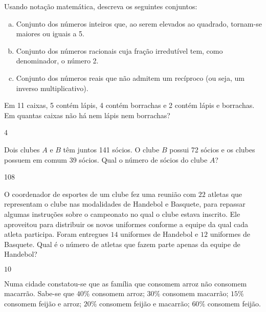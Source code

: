 \newpage
\begin{secExercicios}

\begin{exer}
    Usando notação matemática, descreva os seguintes conjuntos:
    \begin{enumerate}[a)]
        \item Conjunto dos números inteiros que, ao serem elevados ao quadrado, tornam-se maiores ou iguais a 5.
        \item Conjunto dos números racionais cuja fração irredutível tem, como denominador, o número 2.
        \item Conjunto dos números reais que não admitem um recíproco (ou seja, um inverso multiplicativo).
    \end{enumerate}
\end{exer}

\begin{exer}
    Em 11 caixas, 5 contém lápis, 4 contém borrachas e 2 contém lápis e borrachas. Em quantas caixas não há nem lápis nem borrachas?
\end{exer}
\begin{resp}
    4
\end{resp}

\begin{exer}
    Dois clubes $A$ e $B$ têm juntos 141 sócios. O clube $B$ possui 72 sócios e os clubes possuem em comum 39 sócios. Qual o número de sócios do clube $A$?
\end{exer}
\begin{resp}
    108
\end{resp}

\begin{exer}
O coordenador de esportes de um clube fez uma reunião com $22$ atletas que representam o clube nas modalidades de Handebol e Basquete, para repassar algumas instruções sobre o campeonato no qual o clube estava inscrito. Ele aproveitou para distribuir os novos uniformes conforme a equipe da qual cada atleta participa. Foram entregues $14$ uniformes de Handebol e $12$ uniformes de Basquete. Qual é o número de atletas que fazem parte apenas da equipe de Handebol?
\end{exer}
\begin{resp}
$10$
\end{resp}

\begin{exer}
    Numa cidade constatou-se que as família que consomem arroz não consomem macarrão. Sabe-se que $40\%$ consomem arroz; $30\%$ consomem macarrão; $15\%$ consomem feijão e arroz; $20\%$ consomem feijão e macarrão; $60\%$ consomem feijão.


\end{exer}
\end{secExercicios}
